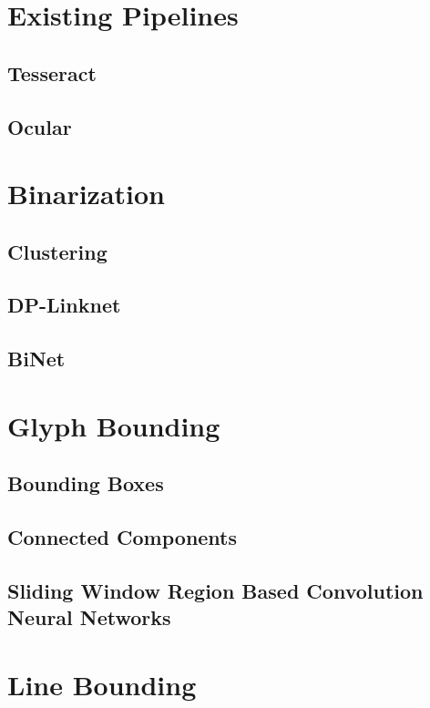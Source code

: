 \section{Existing Pipelines}

\subsection{Tesseract}
\todo{}

\subsection{Ocular}
\todo{}


\section{Binarization}

\subsection{Clustering}
\todo{}

\subsection{DP-Linknet}
\todo{}

\subsection{BiNet}
\todo{}


\section{Glyph Bounding}

\subsection{Bounding Boxes}
\todo{}

\subsection{Connected Components}
\todo{}

\subsection{Sliding Window Region Based Convolution Neural Networks}
\todo{}


\section{Line Bounding}

